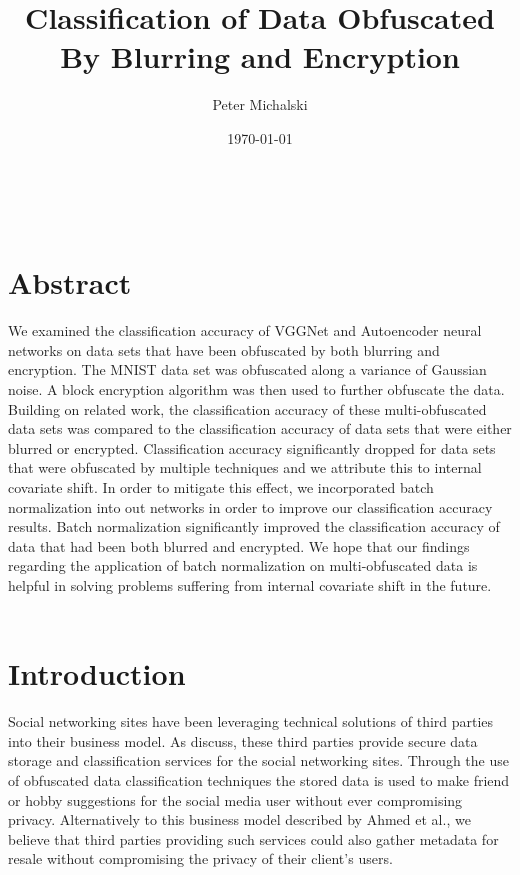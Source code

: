 \documentclass[12pt, titlepage]{article}
\begin{document}
\title{Classification of Data Obfuscated By Blurring and Encryption} 
\author{Peter Michalski}
\date{\today}

\maketitle

\newpage

\tableofcontents
{}

~\newpage
{}

\section{Abstract}

We examined the classification accuracy of VGGNet and Autoencoder neural networks on data sets that have been obfuscated by both blurring and encryption. The MNIST data set was obfuscated along a variance of Gaussian noise. A block encryption algorithm was then used to further obfuscate the data.
Building on related work, the classification accuracy of these multi-obfuscated data sets was compared to the classification accuracy of data sets that were either blurred or encrypted. Classification accuracy significantly dropped for data sets that were obfuscated by multiple techniques and we attribute this to internal covariate shift. In order to mitigate this effect, we incorporated batch normalization into out networks in order to improve our classification accuracy results. Batch normalization significantly improved the classification accuracy of data that had been both blurred and encrypted. We hope that our findings regarding the application of batch normalization on multi-obfuscated data is helpful in solving problems suffering from internal covariate shift in the future.\\


~\newpage
\section{Introduction}

Social networking sites have been leveraging technical solutions of third parties into their business model. As \cite{ahmed2018obfuscated} discuss, these third parties provide secure data storage and classification services for the social networking sites. Through the use of obfuscated data classification techniques the stored data is used to make friend or hobby suggestions for the social media user without ever compromising privacy. Alternatively to this business model described by Ahmed et al., we believe that third parties providing such services could also gather metadata for resale without compromising the privacy of their client's users.\\
\end{document}
